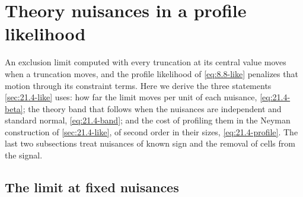 \section{Theory nuisances in a profile likelihood}\label{app:D.47}

An exclusion limit computed with every truncation at its central value moves when a truncation moves, and the profile likelihood of \cref{eq:8.8-like} penalizes that motion through its constraint terms. Here we derive the three statements \cref{sec:21.4-like} uses: how far the limit moves per unit of each nuisance, \cref{eq:21.4-beta}; the theory band that follows when the nuisances are independent and standard normal, \cref{eq:21.4-band}; and the cost of profiling them in the Neyman construction of \cref{sec:21.4-like}, of second order in their sizes, \cref{eq:21.4-profile}. The last two subsections treat nuisances of known sign and the removal of cells from the signal.

\subsection{The limit at fixed nuisances}

